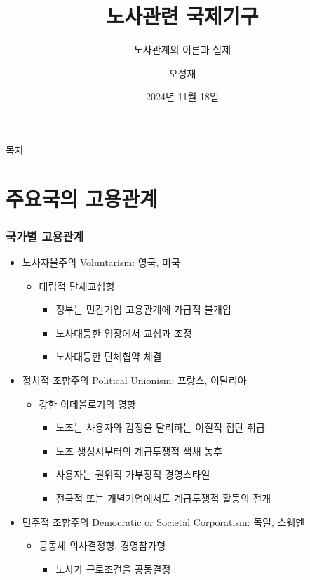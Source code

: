 \documentclass[aspectratio=169,xcolor=dvipsnames,handout]{beamer}
\title{노사관련 국제기구}
\subtitle{노사관계의 이론과 실제}
\author{오성재}
\institute[CNU]
{\relax
    충남대학교 경제학과\
    }
\date{2024년 11월 18일}
\begin{document}

\frame{\titlepage}

\begin{frame}{목차}
    \small
    \tableofcontents[hideallsubsections]
\end{frame}

\section{주요국의 고용관계}%
\begin{frame}[allowframebreaks]
    \frametitle{국가별 고용관계}
    \begin{itemize}[<+->]
        \item 노사자율주의 Voluntarism: 영국, 미국
        \begin{itemize}
            \item 대립적 단체교섭형
\begin{itemize}
               \item 정부는 민간기업 고용관계에 가급적 불개입
               \item 노사대등한 입장에서 교섭과 조정
               \item 노사대등한 단체협약 체결
\end{itemize}
        \end{itemize}
        \item 정치적 조합주의 Political Unionism: 프랑스, 이탈리아
        \begin{itemize}
            \item 강한 이데올로기의 영향
\begin{itemize}
               \item 노조는 사용자와 감정을 달리하는 이질적 집단 취급
               \item 노조 생성시부터의 계급투쟁적 색채 농후
               \item 사용자는 권위적 가부장적 경영스타일
               \item 전국적 또는 개별기업에서도 계급투쟁적 활동의 전개
\end{itemize}
        \end{itemize}
        \item 민주적 조합주의 Democratic or Societal Corporatism: 독일, 스웨덴
        \begin{itemize}
            \item 공동체 의사결정형, 경영참가형
\begin{itemize}
               \item 노사가 근로조건을 공동결정

\end{itemize}
\end{itemize}
\end{itemize}
\end{frame}
\end{document}
